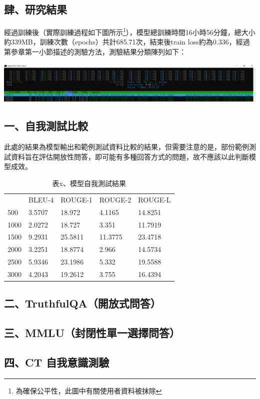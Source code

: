 \documentclass[8pt,a4paper,新細明體,UTF8,natbib]{article}
\begin{document}
\begin{CJK*}{UTF8}{bsmi}
	\section{肆、研究結果}
	經過訓練後（實際訓練過程如下圖所示\footnote{為確保公平性，此圖中有關使用者資料被抹除}），模型總訓練時間16小時56分鐘，總大小約339MB，訓練次數（epochs）共計685.71次，結束後train loss約為0.336，經過第參章第一小節描述的測驗方法，測驗結果分類陳列如下：%

	\includegraphics[width=\textwidth]{running}
	\subsection{一、自我測試比較}
	此處的結果為模型輸出和範例測試資料比較的結果，但需要注意的是，部份範例測試資料旨在評估開放性問答，即可能有多種回答方式的問題，故不應該以此判斷模型成效。
	\begin{table}[H]
		\centering
		\caption{表x、模型自我測試結果}
		\begin{tabular}{lllll}
			     & BLEU-4 & ROUGE-1 & ROUGE-2 & ROUGE-L \\
			500  & 3.5707 & 18.972  & 4.1165  & 14.8251 \\
			1000 & 2.0272 & 18.727  & 3.351   & 11.7919 \\
			1500 & 9.2931 & 25.5811 & 11.3775 & 23.4718 \\
			2000 & 3.2251 & 18.8774 & 2.966   & 14.5734 \\
			2500 & 5.9346 & 23.1986 & 5.332   & 19.5588 \\
			3000 & 4.2043 & 19.2612 & 3.755   & 16.4394
		\end{tabular}
	\end{table}
	\subsection{二、TruthfulQA（開放式問答）}
	\subsection{三、MMLU（封閉性單一選擇問答）}
	\subsection{四、CT 自我意識測驗}

\end{CJK*}
\end{document}
